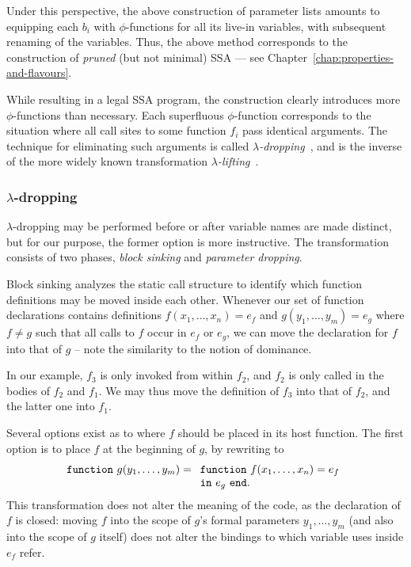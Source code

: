 Under this perspective, the above construction of parameter lists
amounts to equipping each $b_i$ with $\phi$-functions for all its
live-in variables, with subsequent renaming of the variables. Thus,
the above method corresponds to the construction of \emph{pruned} (but
not minimal) SSA --- see Chapter~\ref{chap:properties-and-flavours}.

While resulting in a legal SSA program, the construction clearly
introduces more $\phi$-functions than necessary. Each superfluous
$\phi$-function corresponds to the situation where all call sites to
some function $f_i$ pass identical arguments. The technique for
eliminating such arguments is called
\emph{$\lambda$-dropping}~\cite{DBLP:journals/tcs/DanvyS00}, and is
the inverse of the more widely known transformation
\emph{$\lambda$-lifting}~\cite{DBLP:conf/fpca/Johnsson85}. 

\subsubsection{$\lambda$-dropping}
\label{section:Part1:Semantics:lambdaDropping}

$\lambda$-dropping may be performed before or after variable names are
made distinct, but for our purpose, the former option is more
instructive.  The transformation consists of two phases, \emph{block
sinking} and \emph{parameter dropping}.

Block sinking analyzes the static call structure to identify which
function definitions may be moved inside each other. Whenever our set
of function declarations contains definitions $f (x_1,\ldots,x_n) =
e_f$ and $ g (y_1,\ldots,y_m) = e_g$ where $f \neq g$ such that all
calls to $f$ occur in $e_f$ or $e_g$, we can move the declaration for
$f$ into that of $g$ -- note the similarity to the notion of
dominance.

In our example, $f_3$ is only invoked from
within $f_2$, and $f_2$ is only called in the bodies of $f_2$ and
$f_1$.  We may thus move the definition of $f_3$ into that of $f_2$,
and the latter one into $f_1$.

Several options exist as to where $f$ should be placed in its host
function. The first option is to place $f$ at the beginning of $g$,
by rewriting to 
$$\mathtt{function}\ g(y_1,\ldots,y_m) =
\begin{array}[t]{l} 
  \mathtt{function}\ f(x_1,\ldots,x_n) = e_f\\
  \mathtt{in}\ e_g\ \mathtt{end}.
\end{array}
$$ This transformation does not alter the meaning of the code, as the
declaration of $f$ is closed: moving $f$ into the scope of $g$'s
formal parameters $y_1,\ldots,y_m$ (and also into the scope of $g$
itself) does not alter the bindings to which variable uses inside
$e_f$ refer.


